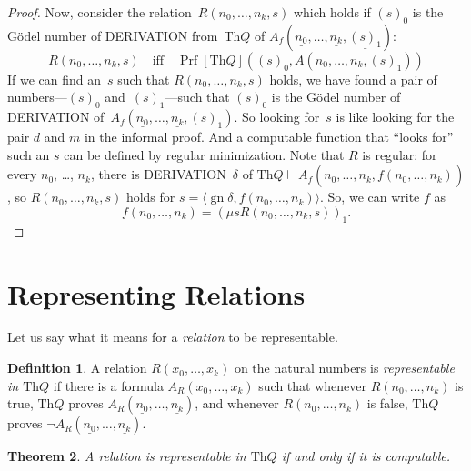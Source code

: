 \documentclass[10pt,a4paper]{article}
\newcommand*{\olup}[1]{\MakeUppercase{#1}}
\theoremstyle{plain}
\newtheorem{thm}{Theorem}[section]
\theoremstyle{definition}
\newtheorem{defn}[thm]{Definition}
\theoremstyle{remark}
\newcommand*{\olfileid}[3]{}
\newcommand*{\olsection}[1]{\section*{#1}}
\newcommand*{\ollabel}[1]{\label{#1}}
\providecommand{\Proves}{\mathrel{\vdash}}
\providecommand{\Th}{\ensuremath{\mathrm{Th}}}
\providecommand{\tuple}[1]{\langle #1 \rangle}
\providecommand{\num}[1]{\underline{#1}}
\providecommand{\Prf}{\operatorname{Prf}}
\providecommand{\Gn}{\operatorname{gn}}
\providecommand{\umin}{\mu}
\begin{document}
\begin{proof}
Now, consider the relation~$R(n_0, \dots, n_k, s)$ which holds if
$(s)_0$ is the G\"odel number of \olup{derivation} from~$\Th{Q}$ of
$A_f(\num{n_0}, \dots, \num{n_k}, \num{(s)_1})$:
\[
R(n_0, \dots, n_k, s) \quad\text{iff}\quad \Prf[\Th{Q}]((s)_0, A(n_0,
\dots, n_k, (s)_1))
\]
If we can find an~$s$ such that $R(n_0, \dots, n_k, s)$ holds, we have
found a pair of numbers---$(s)_0$ and~$(s)_1$---such that $(s)_0$ is
the G\"odel number of \olup{derivation} of~$A_f(\num{n_0}, \dots,
\num{n_k}, (s)_1)$. So looking for~$s$ is like looking for the pair
$d$ and $m$ in the informal proof. And a computable function that
``looks for'' such an $s$ can be defined by regular minimization.
Note that $R$ is regular: for every $n_0$, \dots, $n_k$, there is
\olup{derivation}~$\delta$ of $\Th{Q} \Proves A_f(\num{n_0}, \dots,
\num{n_k}, \num{f(n_0, \dots, n_k)})$, so $R(n_0, \dots, n_k, s)$
holds for $s = \tuple{\Gn{\delta}, f(n_0, \dots, n_k)}$.  So, we can
write $f$ as
\[
f(n_0,\dots,n_{k}) = (\umin{s}{R(n_0, \dots, n_k, s)})_1.
\]
\end{proof}





\olfileid{inc}{req}{rel}

\olsection{Representing Relations}

Let us say what it means for a \emph{relation} to be representable.

\begin{defn}
\ollabel{defn:representing-relations} A relation $R(x_0,\dots,x_k)$ on
the natural numbers is {\em representable in $\Th{Q}$} if there is a
formula $A_R(x_0,\dots,x_k)$ such that whenever $R(n_0,\dots,n_k)$ is
true, $\Th{Q}$ proves $A_R(\num{n_0},\dots,\num{n_k})$, and whenever
$R(n_0,\dots,n_k)$ is false, $\Th{Q}$ proves $\lnot A_R(\num{n_0},
\dots, \num{n_k})$.
\end{defn}

\begin{thm}
\ollabel{thm:representing-rels} A relation is representable in
$\Th{Q}$ if and only if it is computable.
\end{thm}
\end{document}
